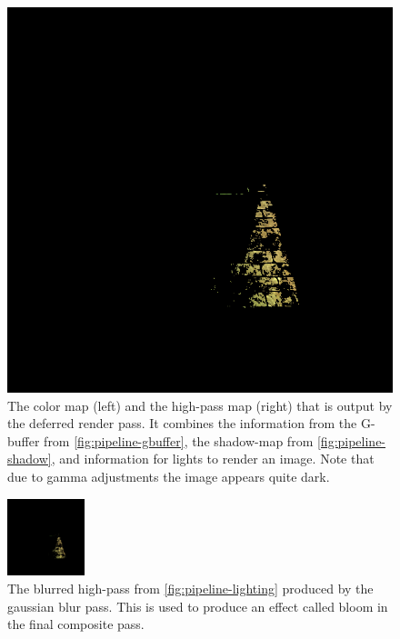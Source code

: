 \documentclass[format=sigconf]{acmart}
\begin{document}
\begin{figure}[h]
\begin{center}
\begin{minipage}{.2\textwidth}
      \includegraphics[width=1.0\textwidth]{pipeline-highpass.png}
    \end{minipage}
  \end{center}
  \caption{The color map (left) and the high-pass map (right) that is output by the deferred render pass. It combines the information from the G-buffer from \autoref{fig:pipeline-gbuffer}, the shadow-map from \autoref{fig:pipeline-shadow}, and information for lights to render an image. Note that due to gamma adjustments the image appears quite dark.}
  \label{fig:pipeline-lighting}
\end{figure}

\begin{figure}[h]
  \begin{center}
    \includegraphics[width=0.2\textwidth]{pipeline-blur.png}
  \end{center}
  \caption{The blurred high-pass from \autoref{fig:pipeline-lighting} produced by the gaussian blur pass. This is used to produce an effect called bloom in the final composite pass.}
  \label{fig:pipeline-blur}
\end{figure}
\end{document}
